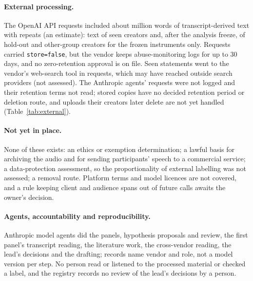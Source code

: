 \paragraph{External processing.} The \ExtRequests{} OpenAI API requests included about \ExtWordsM{} million words of transcript-derived text with repeats (an estimate): text of seen creators and, after the analysis freeze, of hold-out and other-group creators for the frozen instruments only. Requests carried \texttt{store=false}, but the vendor keeps abuse-monitoring logs for up to 30 days, and no zero-retention approval is on file. Seen statements went to the vendor's web-search tool in \ExtWebStatementRequests{} requests, which may have reached outside search providers (not assessed). The Anthropic agents' requests were not logged and their retention terms not read; stored copies have no decided retention period or deletion route, and uploads their creators later delete are not yet handled (Table~\ref{tab:external}).

\paragraph{Not yet in place.} None of these exists: an ethics or exemption determination; a lawful basis for archiving the audio and for sending participants' speech to a commercial service; a data-protection assessment, so the proportionality of external labelling was not assessed; a removal route. Platform terms and model licences are not covered, and a rule keeping client and audience spans out of future calls awaits the owner's decision.

\paragraph{Agents, accountability and reproducibility.} Anthropic model agents did the panels, hypothesis proposals and review, the first panel's transcript reading, the literature work, the cross-vendor reading, the lead's decisions and the drafting; records name vendor and role, not a model version per step. No person read or listened to the processed material or checked a label, and the registry records no review of the lead's decisions by a person.
